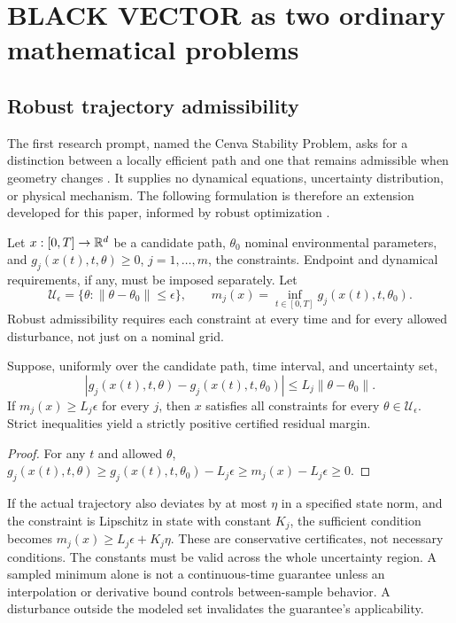\section{BLACK VECTOR as two ordinary mathematical problems}
\subsection{Robust trajectory admissibility}
The first research prompt, named the Cenva Stability Problem, asks for a distinction between a locally efficient path and one that remains admissible when geometry changes . It supplies no dynamical equations, uncertainty distribution, or physical mechanism. The following formulation is therefore an extension developed for this paper, informed by robust optimization \cite{bental}.

Let $x:[0,T]\rightarrow\mathbb{R}^d$ be a candidate path, $\theta_0$ nominal environmental parameters, and $g_j(x(t),t,\theta)\geq0$, $j=1,\ldots,m$, the constraints. Endpoint and dynamical requirements, if any, must be imposed separately. Let
\begin{equation}
 \mathcal U_\epsilon=\{\theta:\|\theta-\theta_0\|\leq\epsilon\},\qquad
 m_j(x)=\inf_{t\in[0,T]}g_j(x(t),t,\theta_0).
\end{equation}
Robust admissibility requires each constraint at every time and for every allowed disturbance, not just on a nominal grid.

\begin{proposition}
Suppose, uniformly over the candidate path, time interval, and uncertainty set,
\begin{equation}
 |g_j(x(t),t,\theta)-g_j(x(t),t,\theta_0)|
 \leq L_j\|\theta-\theta_0\|.
\end{equation}
If $m_j(x)\geq L_j\epsilon$ for every $j$, then $x$ satisfies all constraints for every $\theta\in\mathcal U_\epsilon$. Strict inequalities yield a strictly positive certified residual margin.
\end{proposition}
\begin{proof}
For any $t$ and allowed $\theta$, $g_j(x(t),t,\theta)\geq g_j(x(t),t,\theta_0)-L_j\epsilon\geq m_j(x)-L_j\epsilon\geq0$.
\end{proof}

If the actual trajectory also deviates by at most $\eta$ in a specified state norm, and the constraint is Lipschitz in state with constant $K_j$, the sufficient condition becomes $m_j(x)\geq L_j\epsilon+K_j\eta$. These are conservative certificates, not necessary conditions. The constants must be valid across the whole uncertainty region. A sampled minimum alone is not a continuous-time guarantee unless an interpolation or derivative bound controls between-sample behavior. A disturbance outside the modeled set invalidates the guarantee's applicability.

